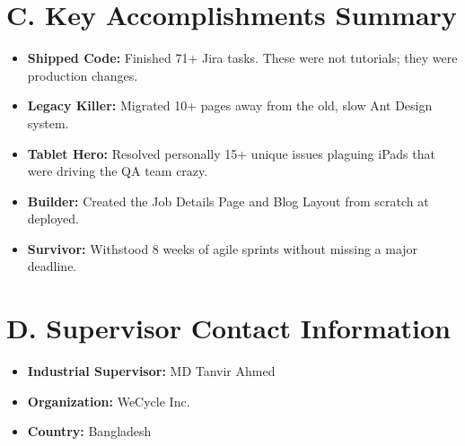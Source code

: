 \section*{C. Key Accomplishments Summary}
\begin{itemize}
    \item \textbf{Shipped Code:} Finished 71+ Jira tasks. These were not tutorials; they were production changes.
    \item \textbf{Legacy Killer:} Migrated 10+ pages away from the old, slow Ant Design system.
    \item \textbf{Tablet Hero:} Resolved personally 15+ unique issues plaguing iPads that were driving the QA team crazy.
    \item \textbf{Builder:} Created the Job Details Page and Blog Layout from scratch at deployed.
    \item \textbf{Survivor:} Withstood 8 weeks of agile sprints without missing a major deadline.
\end{itemize}

\section*{D. Supervisor Contact Information}
\begin{itemize}
    \item \textbf{Industrial Supervisor:} MD Tanvir Ahmed
    \item \textbf{Organization:} WeCycle Inc.
    \item \textbf{Country:} Bangladesh
\end{itemize}